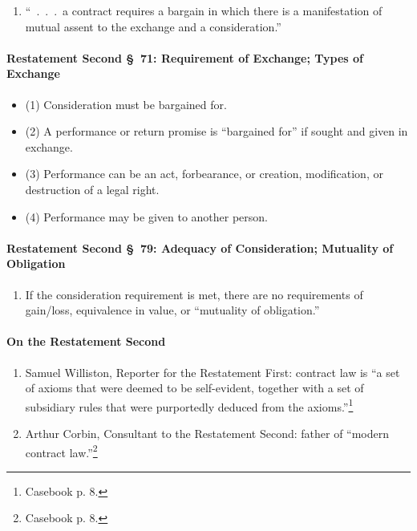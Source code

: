 \begin{enumerate}
    \item ``~.~.~.~a contract requires a bargain in which there is a 
    manifestation of mutual assent to the exchange and a consideration.''
\end{enumerate}

\paragraph{Restatement Second \S\ 71: Requirement of Exchange; Types of 
Exchange}

\begin{itemize}
    \item (1) Consideration must be bargained for. 
    \item (2) A performance or return promise is ``bargained for'' if sought and given in exchange.
    \item (3) Performance can be an act, forbearance, or creation, 
    modification, or destruction of a legal right.
    \item (4) Performance may be given to another person.
\end{itemize}

\paragraph{Restatement Second \S\ 79: Adequacy of Consideration; Mutuality 
of Obligation}

\begin{enumerate}
    \item If the consideration requirement is met, there are no requirements 
    of gain/loss, equivalence in value, or ``mutuality of obligation.''
\end{enumerate}

\paragraph{On the Restatement Second}

\begin{enumerate}
    \item Samuel Williston, Reporter for the Restatement First: contract law 
    is ``a set of axioms that were deemed to be self-evident, together with a 
    set of subsidiary rules that were purportedly deduced from the 
    axioms.''\footnote{Casebook p. 8.}
    \item Arthur Corbin, Consultant to the Restatement Second: father of 
    ``modern contract law.''\footnote{Casebook p. 8.}
\end{enumerate}


